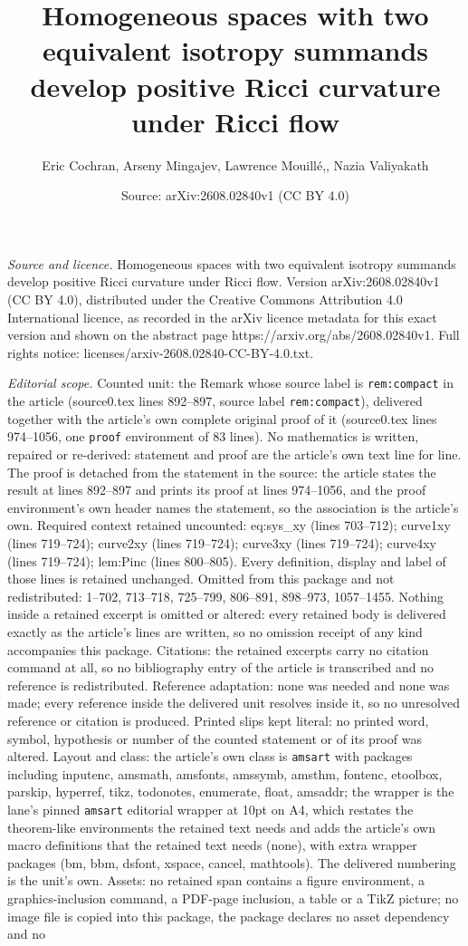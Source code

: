 \documentclass[10pt,a4paper]{amsart}
\title[Homogeneous spaces with two equivalent isotropy summands dev]{Homogeneous spaces with two equivalent isotropy summands develop positive Ricci curvature under Ricci flow}
\author{Eric Cochran, Arseny Mingajev, Lawrence Mouill\'e,, Nazia Valiyakath}
\date{Source: arXiv:2608.02840v1 (CC BY 4.0)}
\begin{document}
\maketitle

\noindent\emph{Source and licence.} Homogeneous spaces with two equivalent isotropy summands develop positive Ricci curvature under Ricci flow. Version arXiv:2608.02840v1 (CC BY 4.0), distributed under the Creative Commons Attribution 4.0 International licence, as recorded in the arXiv licence metadata for this exact version and shown on the abstract page https://arxiv.org/abs/2608.02840v1. Full rights notice: licenses/arxiv-2608.02840-CC-BY-4.0.txt.\par\smallskip

\noindent\textit{Editorial scope.} Counted unit: the Remark whose source label is \texttt{rem:compact} in the article (source0.tex lines 892--897, source label \texttt{rem:compact}), delivered together with the article's own complete original proof of it (source0.tex lines 974--1056, one \texttt{proof} environment of 83 lines). No mathematics is written, repaired or re-derived: statement and proof are the article's own text line for line. The proof is detached from the statement in the source: the article states the result at lines 892--897 and prints its proof at lines 974--1056, and the proof environment's own header names the statement, so the association is the article's own. Required context retained uncounted: eq:sys\_xy (lines 703--712); curve1xy (lines 719--724); curve2xy (lines 719--724); curve3xy (lines 719--724); curve4xy (lines 719--724); lem:Pinc (lines 800--805). Every definition, display and label of those lines is retained unchanged. Omitted from this package and not redistributed: 1--702, 713--718, 725--799, 806--891, 898--973, 1057--1455. Nothing inside a retained excerpt is omitted or altered: every retained body is delivered exactly as the article's lines are written, so no omission receipt of any kind accompanies this package. Citations: the retained excerpts carry no citation command at all, so no bibliography entry of the article is transcribed and no reference is redistributed. Reference adaptation: none was needed and none was made; every reference inside the delivered unit resolves inside it, so no unresolved reference or citation is produced. Printed slips kept literal: no printed word, symbol, hypothesis or number of the counted statement or of its proof was altered. Layout and class: the article's own class is \texttt{amsart} with packages including inputenc, amsmath, amsfonts, amssymb, amsthm, fontenc, etoolbox, parskip, hyperref, tikz, todonotes, enumerate, float, amsaddr; the wrapper is the lane's pinned \texttt{amsart} editorial wrapper at 10pt on A4, which restates the theorem-like environments the retained text needs and adds the article's own macro definitions that the retained text needs (none), with extra wrapper packages (bm, bbm, dsfont, xspace, cancel, mathtools). The delivered numbering is the unit's own. Assets: no retained span contains a figure environment, a graphics-inclusion command, a PDF-page inclusion, a table or a TikZ picture; no image file is copied into this package, the package declares no asset dependency and no 
\end{document}
